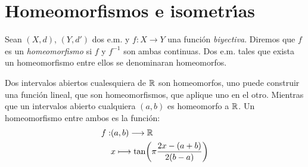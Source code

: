 \section{Homeomorfismos e isometr\'{\i}as}

\begin{definicion} Sean $(X,d)$, $(Y,d')$ dos e.m. y
$f:X\rightarrow Y$ una funci\'on \emph{biyectiva}. Diremos que $f$
es un \emph{homeomorfismo} si $f$ y $f^{-1}$ son ambas continuas.
Dos e.m. tales que exista un homeomorfismo entre ellos se
denominaran homeomorfos.
\end{definicion}

\begin{ejemplo} Dos intervalos abiertos cualesquiera de $\rr$ son
homeomorfos, uno puede construir una funci\'on lineal, que son
homeomorfismos, que aplique uno en el otro. Mientras que un
intervalos abierto  cualquiera $(a,b)$ es homeomorfo a $\rr$. Un
homeomorfismo entre ambos es la funci\'on:
\[
    \begin{split}
        f:&(a,b)\longrightarrow\rr\\
          &x\longmapsto
          \text{tan}\biggl(\pi\frac{2x-(a+b)}{2(b-a)}\biggr)
    \end{split}
\]
\end{ejemplo}

